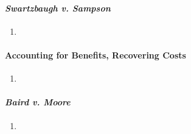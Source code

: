 \paragraph{\emph{Swartzbaugh v. Sampson}}

\begin{enumerate}
    \item %
\end{enumerate}

\paragraph{Accounting for Benefits, Recovering Costs}

\begin{enumerate}
    \item %
\end{enumerate}

\paragraph{\emph{Baird v. Moore}}

\begin{enumerate}
    \item %
\end{enumerate}

